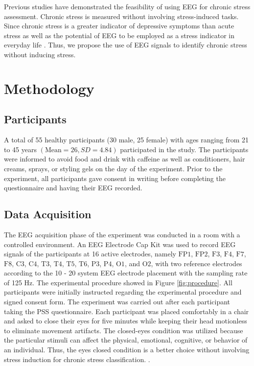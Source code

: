 \documentclass[pdflatex,sn-mathphys]{sn-jnl}%
\theoremstyle{thmstyleone}%
\theoremstyle{thmstyletwo}%
\theoremstyle{thmstylethree}%
\begin{document}
Previous studies have demonstrated the feasibility of using EEG for chronic stress assessment. Chronic stress is measured without involving stress-induced tasks. Since chronic stress is a greater indicator of depressive symptoms than acute stress \cite{McGonagle1990} as well as the potential of EEG to be employed as a stress indicator in everyday life \cite{Saeed2020}. Thus, we propose the use of EEG signals to identify chronic stress without inducing stress.


\section{Methodology}\label{sec3}

\subsection{Participants}\label{subsec1}
A total of 55 healthy participants (30 male, 25 female) with ages ranging from 21 to 45 years $(\text{Mean} = 26, SD = 4.84)$ participated in the study. The participants were informed to avoid food and drink with caffeine as well as conditioners, hair creams, sprays, or styling gels on the day of the experiment. Prior to the experiment, all participants gave consent in writing before completing the questionnaire and having their EEG recorded.

\subsection{Data Acquisition}\label{subsec2}
The EEG acquisition phase of the experiment was conducted in a room with a controlled environment. An EEG Electrode Cap Kit was used to record EEG signals of the participants at 16 active electrodes, namely $\text{FP1}$, $\text{FP2}$, $\text{F3}$, $\text{F4}$, $\text{F7}$, $\text{F8}$, $\text{C3}$, $\text{C4}$, $\text{T3}$, $\text{T4}$, $\text{T5}$, $\text{T6}$, $\text{P3}$, $\text{P4}$, $\text{O1}$, and $\text{O2}$, with two reference electrodes according to the 10 - 20 system EEG electrode placement with the sampling rate of 125 Hz. The experimental procedure showed in Figure \ref{fig:procedure}. All participants were initially instructed regarding the experimental procedure and signed consent form. The experiment was carried out after each participant taking the PSS questionnaire. Each participant was placed comfortably in a chair and asked to close their eyes for five minutes while keeping their head motionless to eliminate movement artifacts. The closed-eyes condition was utilized because the particular stimuli can affect the physical, emotional, cognitive, or behavior of an individual. Thus, the eyes closed condition is a better choice without involving stress induction for chronic stress classification. \cite{Khosrowabadi-2011, Peng-2012, Saeed2020}.
 
\end{document}

